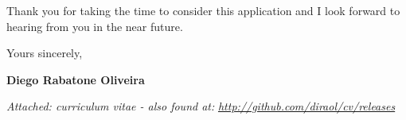 \documentclass[11pt]{friggeri-cover-letter}
\begin{document}
Thank you for taking the time to consider this application and I look forward to hearing from you in the near future.

\vfill

\hfill Yours sincerely,

\hfill \textbf{Diego Rabatone Oliveira}

\vfill

\footnotesize{\thinfont\color{lightgray}\textit{Attached: curriculum vitae - also found at:} \textit{\url{http://github.com/diraol/cv/releases}}}
\end{document}

